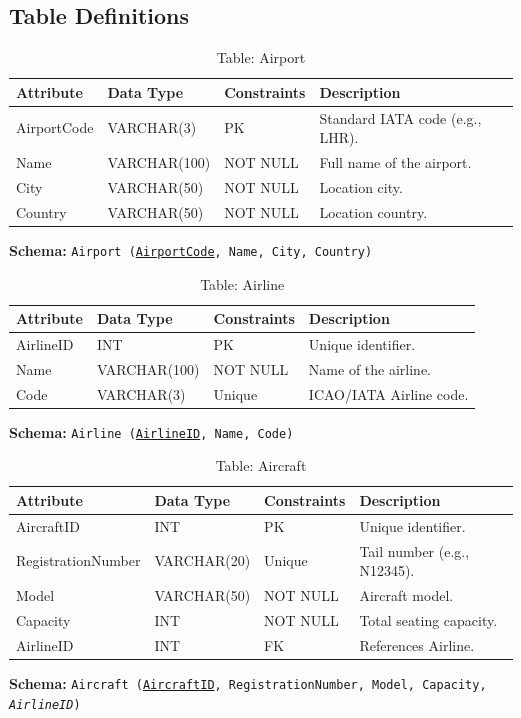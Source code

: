 \documentclass[12pt, a4paper]{article}
\begin{document}
	\subsection{Table Definitions}
	
	\begin{table}[H]
		\centering
		\caption{Table: Airport}
		\begin{tabular}{|l|l|l|p{5cm}|}
			\hline
			\textbf{Attribute} & \textbf{Data Type} & \textbf{Constraints} & \textbf{Description} \\
			\hline
			AirportCode & VARCHAR(3) & PK & Standard IATA code (e.g., LHR). \\
			\hline
			Name & VARCHAR(100) & NOT NULL & Full name of the airport. \\
			\hline
			City & VARCHAR(50) & NOT NULL & Location city. \\
			\hline
			Country & VARCHAR(50) & NOT NULL & Location country. \\
			\hline
		\end{tabular}
	\end{table}
	\noindent \textbf{Schema:} \texttt{Airport (\underline{AirportCode}, Name, City, Country)}
	
	\begin{table}[H]
		\centering
		\caption{Table: Airline}
		\begin{tabular}{|l|l|l|p{5cm}|}
			\hline
			\textbf{Attribute} & \textbf{Data Type} & \textbf{Constraints} & \textbf{Description} \\
			\hline
			AirlineID & INT & PK & Unique identifier. \\
			\hline
			Name & VARCHAR(100) & NOT NULL & Name of the airline. \\
			\hline
			Code & VARCHAR(3) & Unique & ICAO/IATA Airline code. \\
			\hline
		\end{tabular}
	\end{table}
	\noindent \textbf{Schema:} \texttt{Airline (\underline{AirlineID}, Name, Code)}
	
	\begin{table}[H]
		\centering
		\caption{Table: Aircraft}
		\begin{tabular}{|l|l|l|p{5cm}|}
			\hline
			\textbf{Attribute} & \textbf{Data Type} & \textbf{Constraints} & \textbf{Description} \\
			\hline
			AircraftID & INT & PK & Unique identifier. \\
			\hline
			RegistrationNumber & VARCHAR(20) & Unique & Tail number (e.g., N12345). \\
			\hline
			Model & VARCHAR(50) & NOT NULL & Aircraft model. \\
			\hline
			Capacity & INT & NOT NULL & Total seating capacity. \\
			\hline
			AirlineID & INT & FK & References Airline. \\
			\hline
		\end{tabular}
	\end{table}
	\noindent \textbf{Schema:} \texttt{Aircraft (\underline{AircraftID}, RegistrationNumber, Model, Capacity, \textit{AirlineID})}
	
\end{document}
